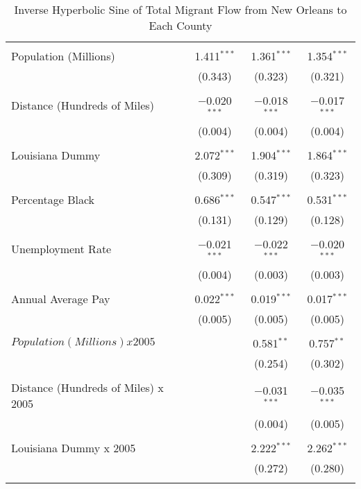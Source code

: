 \documentclass[]{article}
\begin{document}
\begin{table}[!htbp] \scriptsize \centering 
  \caption{Inverse Hyperbolic Sine of Total Migrant Flow from New Orleans to Each County} 
  \label{} 
\begin{tabular}{@{\extracolsep{5pt}}lccc} 
\\[-1.8ex]\hline 
\cline{2-4} 

\hline \\[-1.8ex] 
  Population (Millions) & 1.411$^{***}$ & 1.361$^{***}$ & 1.354$^{***}$ \\ 
  & (0.343) & (0.323) & (0.321) \\ 
  & & & \\ 
 Distance (Hundreds of Miles) & $-$0.020$^{***}$ & $-$0.018$^{***}$ & $-$0.017$^{***}$ \\ 
  & (0.004) & (0.004) & (0.004) \\ 
  & & & \\ 
 Louisiana Dummy & 2.072$^{***}$ & 1.904$^{***}$ & 1.864$^{***}$ \\ 
  & (0.309) & (0.319) & (0.323) \\ 
  & & & \\ 
 Percentage Black & 0.686$^{***}$ & 0.547$^{***}$ & 0.531$^{***}$ \\ 
  & (0.131) & (0.129) & (0.128) \\ 
  & & & \\ 
 Unemployment Rate & $-$0.021$^{***}$ & $-$0.022$^{***}$ & $-$0.020$^{***}$ \\ 
  & (0.004) & (0.003) & (0.003) \\ 
  & & & \\ 
 Annual Average Pay & 0.022$^{***}$ & 0.019$^{***}$ & 0.017$^{***}$ \\ 
  & (0.005) & (0.005) & (0.005) \\ 
  & & & \\ 
 $Population (Millions) x 2005$ &  & 0.581$^{**}$ & 0.757$^{**}$ \\ 
  &  & (0.254) & (0.302) \\ 
  & & & \\ 
 Distance (Hundreds of Miles) x 2005 &  & $-$0.031$^{***}$ & $-$0.035$^{***}$ \\ 
  &  & (0.004) & (0.005) \\ 
  & & & \\ 
 Louisiana Dummy x 2005 &  & 2.222$^{***}$ & 2.262$^{***}$ \\ 
  &  & (0.272) & (0.280) \\ 
  & & & \\ 

\end{tabular}
\end{table}
\end{document}
